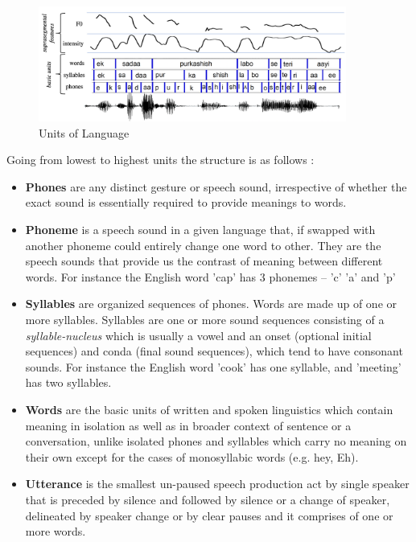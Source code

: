 \begin{figure}[h!]
    \centering
    \includegraphics[width=0.9\textwidth]{img/speech3.png}
    \caption{Units of Language}
    \label{fig:units-of-language2}
\end{figure}

Going from lowest to highest units the structure is as follows \cite{brown_encyclopedia_2006}:
\begin{itemize}
    \item \textbf{Phones} are any distinct gesture or speech sound, irrespective of whether the exact sound is essentially required to provide meanings to words. 
    \item \textbf{Phoneme} is a speech sound in a given language that, if swapped with another phoneme could entirely change one word to other. They are the speech sounds that provide us the contrast of meaning between different words. For instance the English word 'cap' has 3 phonemes – 'c' 'a' and 'p'
    \item \textbf{Syllables} are organized sequences of phones. Words are made up of one or more syllables. Syllables are one or more sound sequences consisting of a \textit{syllable-nucleus} which is usually a vowel and an onset (optional initial sequences) and conda (final sound sequences), which tend to have consonant sounds. For instance the English word 'cook' has one syllable, and 'meeting' has two syllables.
    \item \textbf{Words} are the basic units of written and spoken linguistics which contain meaning in isolation as well as in broader context of sentence or a conversation, unlike isolated phones and syllables which carry no meaning on their own except for the cases of monosyllabic words (e.g. hey, Eh). 
    \item \textbf{Utterance} is the smallest un-paused speech production act by single speaker that is preceded by silence and followed by silence or a change of speaker, delineated by speaker change or by clear pauses and it comprises of one or more words. 
    \begin{itemize}

\end{itemize}
\end{itemize}
